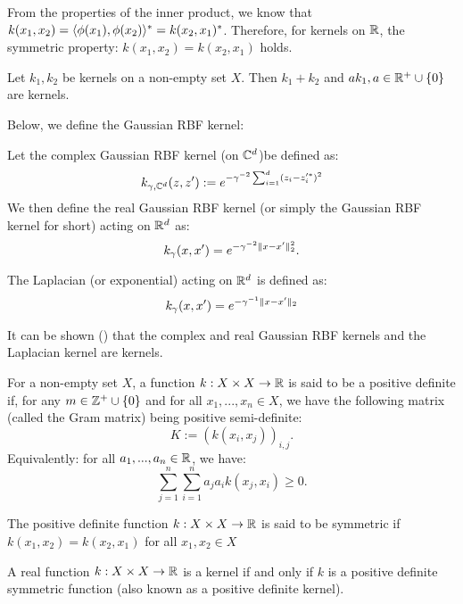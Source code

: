 \documentclass[twoside]{memoir}
\begin{document}
	From the properties of the inner product, we know that $k(x_1, x_2) = \langle\phi(x_1), \phi(x_2)\rangle^* = k(x_2, x_1)^*$. Therefore, for kernels on $\mathbb{R}$, the symmetric property: $k(x_1, x_2) = k(x_2, x_1)$ holds.
	\begin{lem}
		Let $k_1, k_2$ be kernels on a non-empty set $X$. Then $k_1 + k_2$ and $ak_1, a \in \mathbb{R}^+ \cup \{0\}$ are kernels. 
	\end{lem}
	Below, we define the Gaussian RBF kernel:
	\begin{defn}\label{defn:Gaussian_Kernel}
		Let the complex Gaussian RBF kernel (on $\mathbb{C}^d$)be defined as:
		\[ k_{\gamma, \mathbb{C}^d}(z, z') := e^{-\gamma^{-2} \sum_{i=1}^{d} (z_i - z_i'^*)^2 } \]
		We then define the real Gaussian RBF kernel (or simply the Gaussian RBF kernel for short) acting on $\mathbb{R}^d$ as:
		\[ k_\gamma(x, x') = e^{- \gamma^{-2} \lVert x - x'\rVert_2^2}. \]
	\end{defn}
	\begin{defn}
	The Laplacian (or exponential) acting on $\mathbb{R}^d$ is defined as:
	\[ k_\gamma(x, x') = e^{- \gamma^{-1} \lVert x - x'\rVert_2} \]	
	\end{defn}
	It can be shown (\cite{steinwartSVM}) that the complex and real Gaussian RBF kernels and the Laplacian kernel are kernels.
	\begin{defn}
		For a non-empty set $X$, a function $k: X \times X \rightarrow \mathbb{R}$ is said to be a positive definite if, for any $m \in \mathbb{Z}^+ \cup \{0\}$ and for all $x_1, ..., x_n \in X$, we have the following matrix (called the Gram matrix) being positive semi-definite:
		\[ K := (k(x_i, x_j))_{i,j}. \]
		Equivalently: for all $a_1, ..., a_n \in \mathbb{R}$, we have:
		\[ \sum_{j=1}^{n} \sum_{i=1}^{n} a_j a_i k(x_j, x_i) \geq 0. \]
	\end{defn}
	\begin{defn}
		The positive definite function $k: X \times X \rightarrow \mathbb{R}$ is said to be symmetric if  $k(x_1, x_2) = k(x_2, x_1)$ for all $x_1, x_2 \in X$
	\end{defn}
	\begin{thm}
		A real function $k:X \times X \rightarrow \mathbb{R}$ is a kernel if and only if $k$ is a positive definite symmetric function (also known as a positive definite kernel).
	\end{thm}
\end{document}

